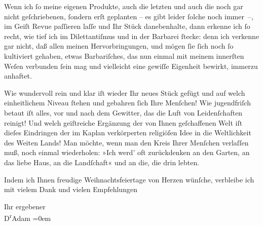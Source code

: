 \pstart
           Wenn ich{ }ſo meine eigenen Produkte, auch die letzten und auch die noch gar nicht
               geſchriebenen,{ }ſondern erſt geplanten – es gibt leider{ }ſolche noch immer –, im Geiſt
               Revue paſſieren laſſe und Ihr Stück danebenhalte, dann erkenne ich{ }ſo recht, wie tief
               ich im Dilettantiſmus und in der Barbarei{ }ſtecke: denn ich verkenne gar nicht, daß
               allen meinen Hervorbringungen, und mögen{ }ſie{ }ſich noch{ }ſo kultiviert gehaben, etwas
               Barbariſches, das nun einmal mit meinem innerſten Weſen verbunden{ }ſein mag und
               vielleicht eine gewiſſe Eigenheit bewirkt, immerzu anhaftet.\pend
           
\pstart
           Wie wundervoll rein und klar iſt wieder Ihr neues Stück gefügt und auf {\pb}welch einheitlichem Niveau{ }ſtehen und
               gebahren{ }ſich Ihre Menſchen! Wie jugendfriſch betaut iſt alles, vor und nach dem
               Gewitter, das die Luft von Leidenſchaften reinigt! Und welch geiſtreiche Ergänzung
               der von Ihnen geſchaffenen Welt iſt dieſes Eindringen der im Kaplan verkörperten
               religiöſen Idee in die Weltlichkeit des Weiten
                  Lands! Man möchte, wenn man den Kreis Ihrer Menſchen verlaſſen muß, noch
               einmal wiederholen: »Ich werd’ oft
                  zurückdenken an den Garten, an das liebe Haus, an die Landſchaft« und an die,
               die drin lebten.\pend
           
\pstart
           Indem ich Ihnen freudige Weihnachtsfeiertage von Herzen wünſche, verbleibe ich mit
               vielem Dank und vielen Empfehlungen\pend
           
\pstart
           Ihr ergebener{\\[\baselineskip]}\spacefill\mbox{D\textsuperscript{r}Adam}\pend
           \leftskip=0em{}\endnumbering{}  \newcommand{\dateiname}{L02527}\newcommand{\titel}{Robert Adam an Arthur Schnitzler, 22. 12. 1929}\newcommand{\editorInnen}{Martin Anton Müller und Gerd-Hermann Susen}
